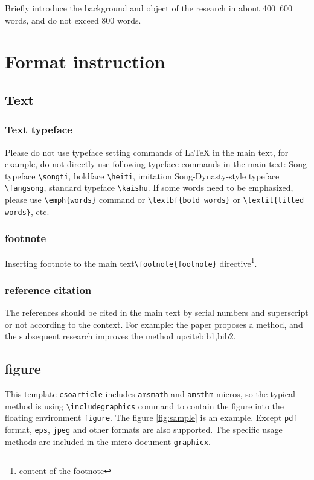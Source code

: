 ﻿\documentclass[UTF8]{csoarticle}
\begin{document}
Briefly introduce the background and object of the research in about 400~600 words, and do not exceed 800 words.

\section{Format instruction}

\subsection{Text}

\subsubsection{Text typeface}

Please do not use typeface setting commands of \LaTeX{} in the main text, for example, do not directly use following typeface commands in the main text: 
Song typeface \verb|\songti|, boldface \verb|\heiti|, imitation Song-Dynasty-style typeface \verb|\fangsong|, standard typeface \verb|\kaishu|.
If some words need to be emphasized, please use \verb|\emph{words}| command or \verb|\textbf{bold words}| or \verb|\textit{tilted words}|, etc.

\subsubsection{footnote}

Inserting footnote to the main text\verb|\footnote{footnote}| directive\footnote{content of the footnote}.

\subsubsection{reference citation}

The references should be cited in the main text by serial numbers and superscript or not according to the context. For example: the paper \cite{bib1} proposes a method, and the subsequent research improves the method upcite{bib1,bib2}.

\subsection{figure}

This template \verb|csoarticle| includes \verb|amsmath| and \verb|amsthm| micros, so the typical method is using \verb|\includegraphics| command to contain the figure into the floating environment \verb|figure|. The figure \ref{fig:sample} is an example. Except \verb|pdf| format, \verb|eps|, \verb|jpeg| and other formats are also supported. The specific usage methods are included in the micro document \verb|graphicx|.
\end{document}
